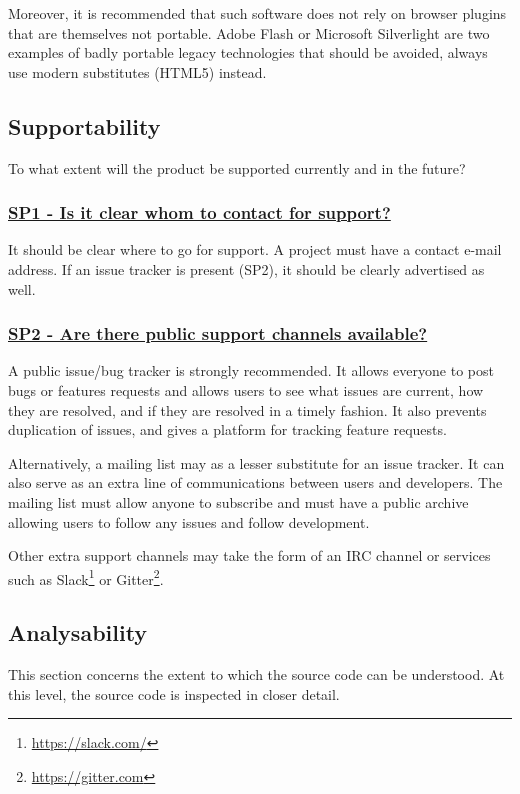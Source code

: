 \documentclass[a4paper,11pt]{article}
\newcommand{\criterion}[2]{\subsubsection*{\underline{#1 - #2}}\label{id:#1}}
\newcommand\CheckTable{%
  \begin{tabular}{ccccc}
    No & Minimal & Adequate & Good & Perfect \\
    0 & 1 & 2 & 3 & 4 \\
    \hline
    $\square$ & $\square$ & $\square$ & $\square$ & $\square$ \\
  \end{tabular}%
}
\begin{document}
Moreover, it is recommended that such software does not rely on browser plugins that
are themselves not portable. Adobe Flash or Microsoft Silverlight are two
examples of badly portable legacy technologies that should be avoided, always use
modern substitutes (HTML5) instead.


\subsection{Supportability}\label{sec:sup}

To what extent will the product be supported currently and in the future?

\newcommand{\spOneID}{SP1}
\newcommand{\spOneText}{Is it clear whom to contact for support?}
\criterion{\spOneID}{\spOneText}

It should be clear where to go for support. A project must have a contact
e-mail address. If an issue tracker is present (SP2), it should be clearly advertised
as well.


\newcommand{\spTwoID}{SP2}
\newcommand{\spTwoText}{Are there public support channels available?}
\criterion{\spTwoID}{\spTwoText}

A public issue/bug tracker is strongly recommended. It allows everyone to post
bugs or features requests and allows users to see what issues are current, how
they are resolved, and if they are resolved in a timely fashion. It also
prevents duplication of issues, and gives a platform for
tracking feature requests.

Alternatively, a mailing list may as a lesser substitute for an issue tracker.
It can also serve as an extra line of communications between users
and developers. The mailing list must allow anyone to subscribe and must have a
public archive allowing users to follow any issues and follow development.

Other extra support channels may take the form of an IRC channel or services
such as Slack\footnote{\url{https://slack.com/}} or
Gitter\footnote{\url{https://gitter.com}}.


\subsection{Analysability}\label{sec:ana}

This section concerns the extent to which the source code can be understood. At
this level, the source code is inspected in closer detail.
\end{document}
